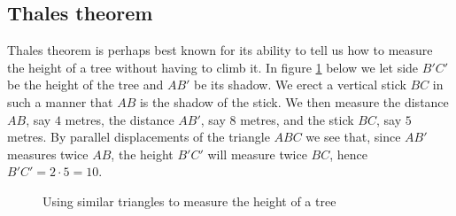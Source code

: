 \subsection{Thales theorem}
Thales theorem is perhaps best known for its ability to tell us how to measure the height of a tree without having to climb it. In figure \ref{geo:thales} below we let side $B'C'$ be the height of the tree and $AB'$ be its shadow. We erect a vertical stick $BC$ in such a manner that $AB$ is the shadow of the stick. We then measure the distance $AB$, say $4$ metres, the distance $AB'$, say $8$ metres, and the stick $BC$, say $5$ metres. By parallel displacements of the triangle $ABC$ we see that, since $AB′$ measures twice $AB$, the height $B'C'$ will measure twice $BC$, hence $B'C' = 2 \cdot 5 = 10$.
\begin{figure}[H]
\label{geo:thales}
\centering
{}
\caption{Using similar triangles to measure the height of a tree}
\end{figure}

